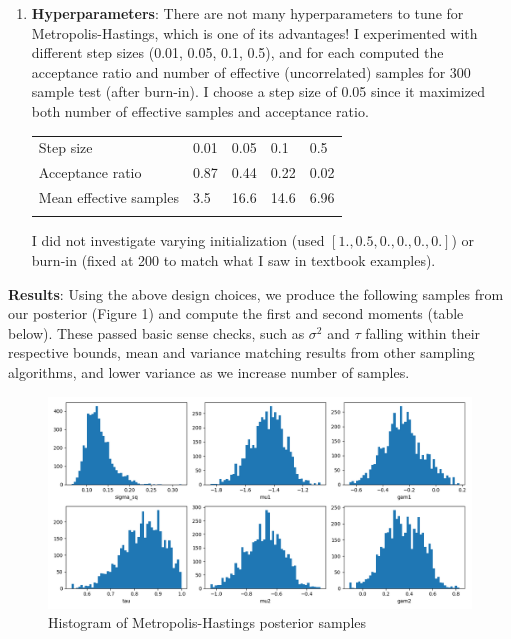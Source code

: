 \documentclass[12pt,letterpaper,twoside]{article}
\begin{document}
\begin{enumerate}[label=(\alph*)]
\item \textbf{Hyperparameters}: There are not many hyperparameters to 
tune for Metropolis-Hastings, which is one of its advantages! I 
experimented with different step sizes (0.01, 0.05, 0.1, 0.5), 
and for each computed the acceptance ratio and number of 
effective (uncorrelated) samples for 300 sample test (after 
burn-in). I choose a step size of 0.05 since it maximized 
both number of effective samples and acceptance ratio.

\begin{table}[H]
    \centering
    \begin{tabular}{lllll}
        Step size                   & 0.01 & 0.05  & 0.1   & 0.5   \\
        Acceptance ratio            & 0.87 & 0.44  & 0.22  & 0.02  \\
        Mean effective samples      & 3.5  & 16.6  & 14.6  & 6.96  \\
                                    &      &       &       &         
    \end{tabular}
\end{table}

I did not investigate varying initialization (used $[1., 0.5, 0., 0., 0., 0.]$)
or burn-in (fixed at 200 to match what I saw in textbook examples).
\end{enumerate}

\textbf{Results}: Using the above design choices, we produce the following 
samples from our posterior (Figure 1) and compute the first and second 
moments (table below). These passed basic sense checks, such as $\sigma^2$ 
and $\tau$ falling within their respective bounds, mean and variance matching 
results from other sampling algorithms, and lower variance as we increase number 
of samples.
\begin{figure}[H]
    \centering
    \includegraphics[scale=0.55]{mh_sampled_histogram.png}
    \vspace*{-10mm}
    \caption{Histogram of Metropolis-Hastings posterior samples}
\end{figure}
\end{document}
